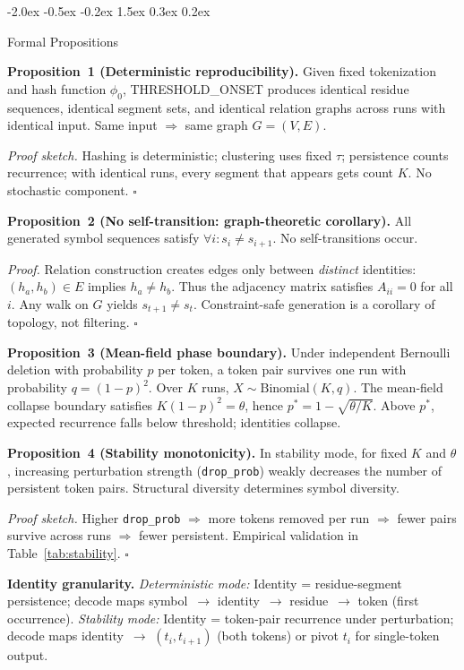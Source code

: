 \documentclass[10pt]{article}
\makeatletter
\renewcommand{\section}{\@startsection{section}{1}{\z@}%
  {-2.0ex \@plus -0.5ex \@minus -0.2ex}%
  {1.5ex \@plus 0.3ex \@minus 0.2ex}%
  {\large\bfseries\raggedright}}
\makeatother
\begin{document}
\section{Formal Propositions}
\label{sec:formal}

\textbf{Proposition~1 (Deterministic reproducibility).}
Given fixed tokenization and hash function $\phi_0$, THRESHOLD\_ONSET produces
identical residue sequences, identical segment sets, and identical relation graphs
across runs with identical input.
Same input $\Rightarrow$ same graph $G = (V, E)$.

\textit{Proof sketch.} Hashing is deterministic; clustering uses fixed $\tau$;
persistence counts recurrence; with identical runs, every segment that appears gets
count $K$. No stochastic component. $\square$

\textbf{Proposition~2 (No self-transition: graph-theoretic corollary).}
All generated symbol sequences satisfy $\forall i: s_i \neq s_{i+1}$.
No self-transitions occur.

\textit{Proof.} Relation construction creates edges only between \emph{distinct}
identities: $(h_a, h_b) \in E$ implies $h_a \neq h_b$. Thus the adjacency matrix
satisfies $A_{ii} = 0$ for all $i$. Any walk on $G$ yields $s_{t+1} \neq s_t$.
Constraint-safe generation is a corollary of topology, not filtering. $\square$

\textbf{Proposition~3 (Mean-field phase boundary).}
Under independent Bernoulli deletion with probability $p$ per token, a token pair
survives one run with probability $q = (1-p)^2$. Over $K$ runs,
$X \sim \text{Binomial}(K, q)$. The mean-field collapse boundary satisfies
$K(1-p)^2 = \theta$, hence $p^* = 1 - \sqrt{\theta/K}$. Above $p^*$, expected
recurrence falls below threshold; identities collapse.

\textbf{Proposition~4 (Stability monotonicity).}
In stability mode, for fixed $K$ and $\theta$, increasing perturbation strength
(\texttt{drop\_prob}) weakly decreases the number of persistent token pairs.
Structural diversity determines symbol diversity.

\textit{Proof sketch.} Higher \texttt{drop\_prob} $\Rightarrow$ more tokens removed
per run $\Rightarrow$ fewer pairs survive across runs $\Rightarrow$ fewer persistent.
Empirical validation in Table~\ref{tab:stability}. $\square$

\textbf{Identity granularity.}
\textit{Deterministic mode:} Identity = residue-segment persistence; decode maps
symbol~$\rightarrow$ identity~$\rightarrow$ residue~$\rightarrow$ token (first
occurrence). \textit{Stability mode:} Identity = token-pair recurrence under
perturbation; decode maps identity~$\rightarrow$ $(t_i, t_{i+1})$ (both tokens) or
pivot $t_i$ for single-token output.
\end{document}
